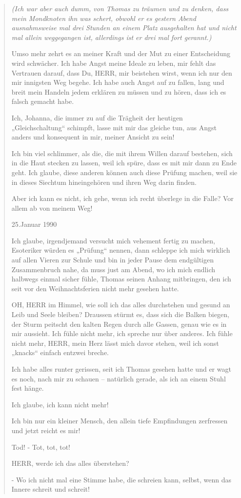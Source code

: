 \documentclass[10pt,titlepage,a5paper]{book}
\newenvironment{tg}{\begin{quote}\em}{\end{quote}}
\begin{document}
\begin{tg}
(Ich war aber auch dumm, von Thomas zu träumen und zu denken, dass mein Mondknoten ihn was schert, obwohl er es gestern Abend ausnahmsweise mal drei Stunden an einem Platz ausgehalten hat und nicht mal allein weggegangen ist, allerdings ist er drei mal fort gerannt.)

Umso mehr zehrt es an meiner Kraft und der Mut zu einer Entscheidung wird schwächer. Ich habe Angst meine Ideale zu leben, mir fehlt das Vertrauen darauf, dass Du, HERR, mir beistehen wirst, wenn ich nur den mir innigsten Weg begehe.  Ich habe auch Angst auf zu fallen, lang und breit mein Handeln jedem erklären zu müssen und zu hören, dass ich es falsch gemacht habe.

Ich, Johanna, die immer zu auf die Trägheit der heutigen „Gleichschaltung“ schimpft, lasse mit mir das gleiche tun, aus Angst anders und konsequent in mir, meiner Ansicht zu sein!

Ich bin viel schlimmer, als die, die mit ihrem Willen darauf bestehen, sich in die Haut stecken zu lassen, weil ich spüre, dass es mit mir dann zu Ende geht. Ich glaube, diese anderen können auch diese Prüfung machen, weil sie in dieses Siechtum hineingehören und ihren Weg darin finden.

Aber ich kann es nicht, ich gehe, wenn ich recht überlege in die Falle?
Vor allem ab von meinem Weg!

25.Januar 1990

Ich glaube, irgendjemand versucht mich vehement fertig zu machen, Esoteriker würden es „Prüfung“ nennen, dann schleppe ich mich wirklich auf allen Vieren zur Schule und bin in jeder Pause dem endgültigen Zusammenbruch nahe, da muss just am Abend, wo ich mich endlich halbwegs einmal sicher fühle, Thomas seinen Anhang mitbringen, den ich seit vor den Weihnachtsferien nicht mehr gesehen hatte.

OH, HERR im Himmel, wie soll ich das alles durchstehen und gesund an Leib und Seele bleiben? Draussen stürmt es, dass sich die Balken biegen, der Sturm peitscht den kalten Regen durch alle Gassen, genau wie es in mir aussieht. Ich fühle nicht mehr, ich spreche nur über anderes.  Ich fühle nicht mehr, HERR, mein Herz lässt mich davor stehen, weil ich sonst „knacks“ einfach entzwei breche.

Ich habe alles runter gerissen, seit ich Thomas gesehen hatte und er wagt es noch, nach mir zu schauen – natürlich gerade, als ich an einem Stuhl fest hänge.

Ich glaube, ich kann nicht mehr!

Ich bin  nur ein kleiner Mensch, den allein tiefe Empfindungen zerfressen und jetzt reicht es mir!

Tod! - Tot, tot, tot!

HERR, werde ich das alles überstehen?

- Wo ich nicht mal eine Stimme habe, die schreien kann, selbst, wenn das Innere schreit und schreit!
\end{tg}
\end{document}
